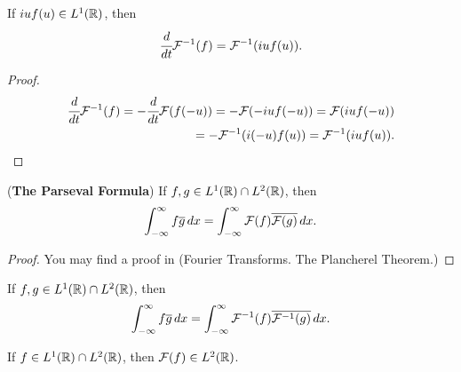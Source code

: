 \documentclass[main.tex]{subfiles}
\begin{document}
\begin{theorem}
\label{fourier_deriv}
If $iuf(u)\in L^1(\mathbb{R})$, then
\begin{equation}
    \cfrac{d}{dt}\mathcal{F}^{-1}(f) = \mathcal{F}^{-1}(iuf(u)).
\end{equation}
\end{theorem}
\begin{proof}

\begin{equation}
\begin{split}
 \cfrac{d}{dt}\mathcal{F}^{-1}(f) = -\cfrac{d}{dt}\mathcal{F}(f(-u)) = -\mathcal{F}(-iuf(-u)) = \mathcal{F}(iuf(-u)) \\
 = - \mathcal{F}^{-1}(i(-u)f(u)) = \mathcal{F}^{-1}(iuf(u)).
 \end{split}
\end{equation}

\end{proof}
\begin{theorem}\label{plancherel}(\textbf{The Parseval Formula}) If $f,g\in L^1(\mathbb{R})\cap L^2(\mathbb{R})$, then
\begin{equation}
    \int_{-\infty}^{\infty} f\overline{g}\,dx = \int_{-\infty}^{\infty} \mathcal{F}(f)\overline{\mathcal{F}(g)}\,dx.
\end{equation}
\end{theorem}
\begin{proof}
You may find a proof in \cite{rudin1987} (Fourier Transforms. The Plancherel Theorem.)
\end{proof}
\begin{corollary}
\label{plancherel_corollary}
If $f,g\in L^1(\mathbb{R})\cap L^2(\mathbb{R})$, then
\begin{equation}
    \int_{-\infty}^{\infty} f\overline{g}\,dx = \int_{-\infty}^{\infty} \mathcal{F}^{-1}(f)\overline{\mathcal{F}^{-1}(g)}\,dx.
\end{equation}
\end{corollary}

\begin{corollary}
If $f\in L^1(\mathbb{R})\cap L^2(\mathbb{R})$, then $\mathcal{F}(f)\in L^2(\mathbb{R})$.
\end{corollary}
\end{document}
